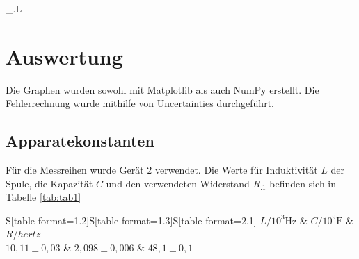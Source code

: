 \sigma_.L\section{Auswertung}
\label{sec:Auswertung}


Die Graphen wurden sowohl mit Matplotlib \cite{matplotlib} als auch NumPy \cite{numpy} erstellt. Die
Fehlerrechnung wurde mithilfe von Uncertainties \cite{uncertainties} durchgeführt.

\subsection{Apparatekonstanten}
Für die Messreihen wurde Gerät 2 verwendet.
Die Werte für Induktivität $L$ der Spule, die Kapazität $C$ und den verwendeten Widerstand $R_.1$ befinden sich in Tabelle \ref{tab:tab1}

\begin{table}
	\centering
	\caption{Apparatekonstanten}
\label{tab:tab1}
	\begin{tabular}{S[table-format=1.2]S[table-format=1.3]S[table-format=2.1]}
		\toprule
		{$L/ 10^3 \si{\hertz}$} & {$C/10^9\si{\farad}$} & {$R/\si{hertz}$} \\
		\midrule
		${10,11\pm 0,03}$ & ${2,098\pm 0,006}$ & ${48,1\pm 0,1}$ \\
		\bottomrule
	\end{tabular}
\end{table}
